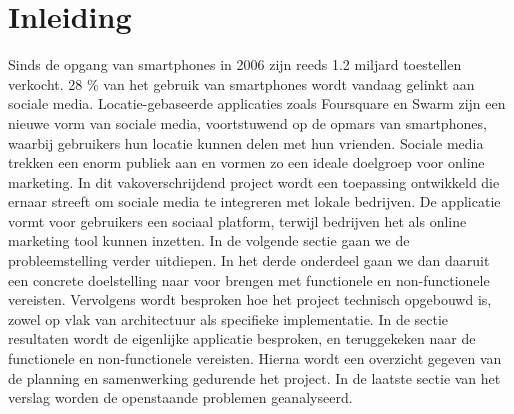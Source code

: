 \chapter{Inleiding}

Sinds de opgang van smartphones in 2006 zijn reeds 1.2 miljard toestellen verkocht\cite{smartphone_sales}. 28 \% van het gebruik van smartphones wordt vandaag gelinkt aan sociale media. Locatie-gebaseerde applicaties zoals Foursquare\cite{foursquare} en Swarm\cite{swarm} zijn een nieuwe vorm van sociale media, voortstuwend op de opmars van smartphones, waarbij gebruikers hun locatie kunnen delen met hun vrienden.
Sociale media trekken een enorm publiek aan en vormen zo een ideale doelgroep voor online marketing. 
In dit vakoverschrijdend project wordt een toepassing ontwikkeld die ernaar streeft om sociale media te integreren met lokale bedrijven.
De applicatie vormt voor gebruikers een sociaal platform, terwijl bedrijven het als online marketing tool kunnen inzetten.
In de volgende sectie gaan we de probleemstelling verder uitdiepen. In het derde onderdeel  gaan we dan daaruit een concrete doelstelling naar voor brengen met functionele en non-functionele vereisten. Vervolgens wordt besproken hoe het project technisch opgebouwd is, zowel op vlak van architectuur als specifieke implementatie. In de sectie resultaten wordt de eigenlijke applicatie besproken, en teruggekeken naar de functionele en non-functionele vereisten. Hierna wordt een overzicht gegeven van de planning en samenwerking gedurende het project. In de laatste sectie van het verslag worden de openstaande problemen geanalyseerd.